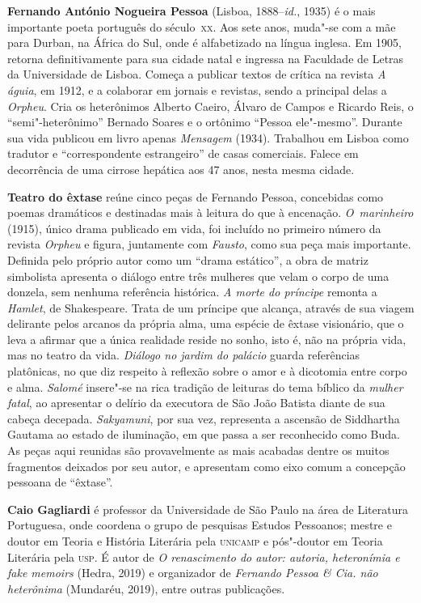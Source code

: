 \textbf{Fernando António Nogueira Pessoa} (Lisboa, 1888--\textit{id.}, 1935) é o mais
importante poeta português do século~\textsc{xx}. Aos sete anos, muda"-se com a mãe para Durban,
na África do Sul, onde é alfabetizado na língua inglesa.
Em 1905, retorna definitivamente para sua cidade natal e ingressa na Faculdade de Letras
da Universidade de Lisboa. Começa a publicar textos de crítica na revista
\textit{A águia}, em 1912, e a colaborar em jornais e revistas, sendo a principal delas a 
\textit{Orpheu}. Cria os heterônimos Alberto Caeiro, Álvaro
de Campos e Ricardo Reis, o ``semi"-heterônimo'' Bernado Soares e o ortônimo
``Pessoa ele"-mesmo''. Durante sua vida publicou em livro apenas \textit{Mensagem} (1934). 
Trabalhou em Lisboa como tradutor e ``correspondente estrangeiro'' de casas comerciais. 
Falece em decorrência de uma cirrose hepática aos 47 anos, nesta mesma cidade. 

\textbf{Teatro do êxtase} reúne cinco peças de Fernando Pessoa, concebidas 
como poemas dramáticos e destinadas mais à leitura do que à encenação. 
\textit{O~marinheiro} (1915), único drama publicado em vida, foi incluído no
primeiro número da revista \textit{Orpheu} e figura, juntamente com
\textit{Fausto}, como sua peça mais importante.  Definida pelo próprio autor
como um ``drama estático'', a obra de matriz simbolista apresenta o diálogo
entre três mulheres que velam o corpo de uma donzela, sem nenhuma referência
histórica. 
%
\textit{A morte do príncipe} remonta a \textit{Hamlet}, de Shakespeare. 
Trata de um príncipe que
alcança, através de sua viagem delirante pelos arcanos da própria alma,
uma espécie de êxtase visionário, que o leva a afirmar que a única
realidade reside no sonho, isto é, não na própria vida, mas no teatro
da vida. 
%
\textit{Diálogo no jardim do palácio} guarda referências platônicas,
no que diz respeito à reflexão sobre o amor e à dicotomia
entre corpo e alma.
%
\textit{Salomé} insere"-se na rica tradição de leituras do
tema bíblico da \textit{mulher fatal}, ao apresentar o delírio 
da executora de São João Batista diante de sua cabeça decepada. 
%
\textit{Sakyamuni}, por sua vez, representa a ascensão de Siddhartha Gautama ao estado de
iluminação, em que passa a ser reconhecido como Buda. 
%
As peças aqui reunidas são provavelmente as mais acabadas
dentre os muitos fragmentos deixados por seu autor, e apresentam
como eixo comum a concepção pessoana de ``êxtase''.


\textbf{Caio Gagliardi} é professor da Universidade de São Paulo na área de Literatura Portuguesa, onde coordena o grupo de pesquisas Estudos Pessoanos; mestre e doutor em Teoria e História Literária pela \textsc{unicamp}
e pós"-doutor em Teoria Literária pela \textsc{usp}. É autor de \textit{O renascimento do autor: autoria, heteronímia e \textit{fake memoirs}} (Hedra, 2019) e organizador de \textit{Fernando Pessoa \& Cia. não heterônima} (Mundaréu, 2019), entre outras publicações.




